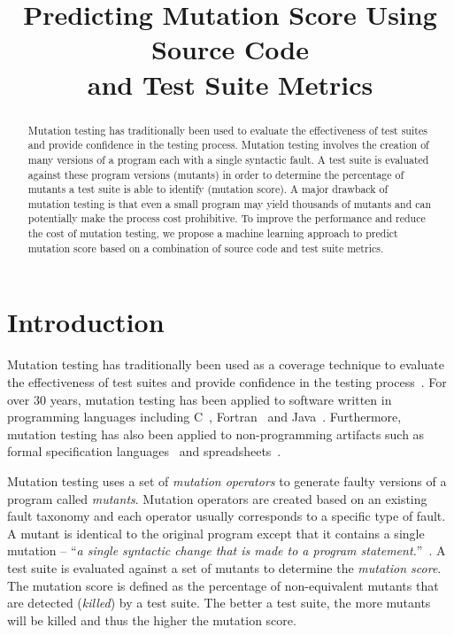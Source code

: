 \documentclass[10pt,conference,compsocconf]{IEEEtran}
\begin{document}
\title{Predicting Mutation Score Using Source Code\\and Test Suite Metrics}


\author{
}


\maketitle


\begin{abstract}
Mutation testing has traditionally been used to evaluate the effectiveness of test suites and provide confidence in the testing process. Mutation testing involves the creation of many versions of a program each with a single syntactic fault. A test suite is evaluated against these program versions (mutants) in order to determine the percentage of mutants a test suite is able to identify (mutation score). A major drawback of mutation testing is that even a small program may yield thousands of mutants and can potentially make the process cost prohibitive. To improve the performance and reduce the cost of mutation testing, we propose a machine learning approach to predict mutation score based on a combination of source code and test suite metrics.
\end{abstract}


\IEEEpeerreviewmaketitle


\section{Introduction}
\label{sec:introduction}
Mutation testing has traditionally been used as a coverage technique to evaluate the effectiveness of test suites and provide confidence in the testing process~\cite{DLS78, OAL06, JH10}. For over 30 years, mutation testing has been applied to software written in programming languages including C~\cite{DM96, JH08}, Fortran~\cite{KO91} and Java~\cite{MKO02, BCD06}. Furthermore, mutation testing has also been applied to non-programming artifacts such as formal specification languages~\cite{ABM98} and spreadsheets~\cite{AE09}.

Mutation testing uses a set of \emph{mutation operators} to generate faulty versions of a program called \emph{mutants}. Mutation operators are created based on an existing fault taxonomy and each operator usually corresponds to a specific type of fault. A mutant is identical to the original program except that it contains a single mutation -- ``\emph{a single syntactic change that is made to a program statement.}''~\cite{KO91}. A test suite is evaluated against a set of mutants to determine the \emph{mutation score}. The mutation score is defined as the percentage of non-equivalent mutants that are detected (\emph{killed}) by a test suite. The better a test suite, the more mutants will be killed and thus the higher the mutation score.
\end{document}

